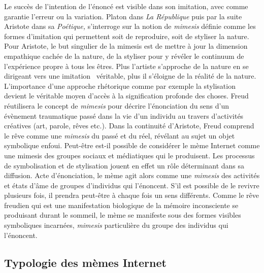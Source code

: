 Le succès de l{\textquoteright}intention de l{\textquoteright}énoncé est visible dans son imitation, avec comme garantie l{\textquoteright}erreur ou la variation. Platon dans \textit{La République} puis par la suite Aristote dans sa \textit{Poétique,} s{\textquoteright}interroge sur la notion de \textit{mimesis} définie comme les formes d{\textquoteright}imitation qui permettent soit de reproduire, soit de styliser la nature. Pour Aristote, le but singulier de la mimesis est de mettre à jour la dimension empathique cachée de la nature, de la styliser pour y révéler le continuum de l{\textquoteright}expérience propre à tous les êtres. Plus l{\textquoteright}artiste s{\textquoteright}approche de la nature en se dirigeant vers une imitation {\guillemotleft}~véritable{\guillemotright}, plus il s{\textquoteright}éloigne de la réalité de la nature. L{\textquoteright}importance d{\textquoteright}une approche rhétorique comme par exemple la stylisation devient le véritable moyen d{\textquoteright}accès à la signification profonde des choses. Freud réutilisera le concept de \textit{mimesis} pour décrire l{\textquoteright}énonciation du sens d{\textquoteright}un évènement traumatique passé dans la vie d{\textquoteright}un individu au travers d{\textquoteright}activités créatives (art, parole, rêves etc.). Dans la continuité d{\textquoteright}Aristote, Freud comprend le rêve comme une \textit{mimesis} du passé et du réel, révélant au sujet un objet symbolique enfoui. Peut-être est-il possible de considérer le mème Internet comme une mimesis des groupes sociaux et médiatiques qui le produisent. Les processus de symbolisation et de stylisation jouent en effet un rôle déterminant dans sa diffusion. Acte d{\textquoteright}énonciation, le mème agit alors comme une \textit{mimesis} des activités et états d{\textquoteright}\^ame de groupes d{\textquoteright}individus qui l{\textquoteright}énoncent. S{\textquoteright}il est possible de le revivre plusieurs fois, il prendra peut-être à chaque fois un sens différents. Comme le rêve freudien qui est une manifestation biologique de la mémoire inconsciente se produisant durant le sommeil, le mème se manifeste sous des formes visibles symboliques incarnées, \textit{mimesis} particulière du groupe des individus qui l{\textquoteright}énoncent. 


\subsection[Typologie des mèmes Internet]{Typologie des mèmes Internet}

